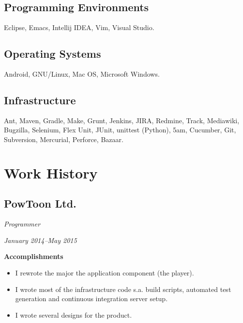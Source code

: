 \documentclass[11pt]{article}
\begin{document}
\subsection{Programming Environments}
\label{sec:orgheadline5}
Eclipse, Emacs, Intellij IDEA, Vim, Visual Studio.

\subsection{Operating Systems}
\label{sec:orgheadline6}
Android, GNU/Linux, Mac OS, Microsoft Windows.

\subsection{Infrastructure}
\label{sec:orgheadline7}
Ant, Maven, Gradle, Make, Grunt, Jenkins, JIRA, Redmine, Track, Mediawiki,
Bugzilla, Selenium, Flex Unit, JUnit, unittest (Python), 5am, Cucumber, Git,
Subversion, Mercurial, Perforce, Bazaar.

\clearpage

\section{Work History}
\label{sec:orgheadline12}

\subsection{PowToon Ltd.}
\label{sec:orgheadline9}
\begin{description}
\item[{Position}] \emph{Programmer}
\item[{Term}] \emph{January 2014--May 2015}
\item \textbf{Accomplishments}
\begin{itemize}
\item I rewrote the major the application component (the player).
\item I wrote most of the infrastructure code s.a. build scripts, automated
test generation and continuous integration server setup.
\item I wrote several designs for the product.
\end{itemize}
\end{description}
\end{document}
